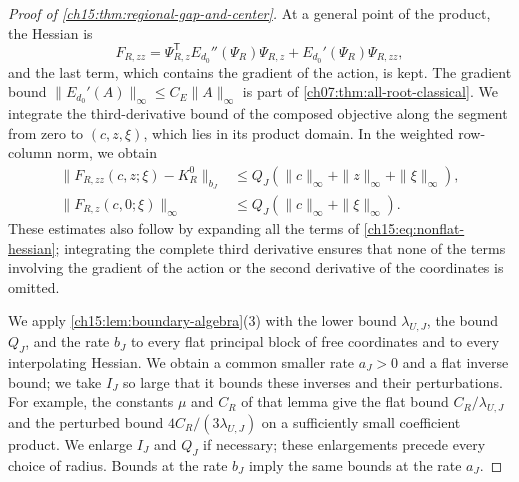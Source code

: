 \begin{proof}[Proof of \cref{ch15:thm:regional-gap-and-center}]
At a general point of the product, the Hessian is
\begin{equation}\label{ch15:eq:nonflat-hessian}
 F_{R,zz}=\Psi_{R,z}^{\mathsf T}E_{d_0}''(\Psi_R)\Psi_{R,z}
                              +E_{d_0}'(\Psi_R)\Psi_{R,zz},
\end{equation}
and the last term, which contains the gradient of the action, is kept. The gradient bound $\|E_{d_0}'(A)\|_\infty\le C_E\|A\|_\infty$ is part of \cref{ch07:thm:all-root-classical}. We integrate the third-derivative bound of the composed objective along the segment from zero to $(c,z,\xi)$, which lies in its product domain. In the weighted row-column norm, we obtain
\begin{align}
 \|F_{R,zz}(c,z;\xi)-K_R^0\|_{b_J}
      &\le Q_J(\|c\|_\infty+\|z\|_\infty+\|\xi\|_\infty),
       \label{ch15:eq:hessian-lipschitz}\\
 \|F_{R,z}(c,0;\xi)\|_\infty
      &\le Q_J(\|c\|_\infty+\|\xi\|_\infty).
       \label{ch15:eq:force-bound}
\end{align}
These estimates also follow by expanding all the terms of \eqref{ch15:eq:nonflat-hessian}; integrating the complete third derivative ensures that none of the terms involving the gradient of the action or the second derivative of the coordinates is omitted.

We apply \cref{ch15:lem:boundary-algebra}(3) with the lower bound $\lambda_{U,J}$, the bound $Q_J$, and the rate $b_J$ to every flat principal block of free coordinates and to every interpolating Hessian. We obtain a common smaller rate $a_J>0$ and a flat inverse bound; we take $I_J$ so large that it bounds these inverses and their perturbations. For example, the constants $\mu$ and $C_R$ of that lemma give the flat bound $C_R/\lambda_{U,J}$ and the perturbed bound $4C_R/(3\lambda_{U,J})$ on a sufficiently small coefficient product. We enlarge $I_J$ and $Q_J$ if necessary; these enlargements precede every choice of radius. Bounds at the rate $b_J$ imply the same bounds at the rate $a_J$.


\end{proof}
